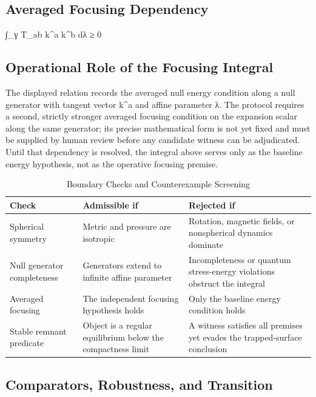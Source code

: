 \documentclass[conference]{IEEEtran}
\begin{document}
\subsection{Averaged Focusing Dependency}
∫\_γ T\_ab k\textasciicircum{}a k\textasciicircum{}b dλ ≥ 0~\cite{cite_0ed84243cf171bc4}

\subsection{Operational Role of the Focusing Integral}
The displayed relation records the averaged null energy condition along a null generator with tangent vector k\textasciicircum{}a and affine parameter λ. The protocol requires a second, strictly stronger averaged focusing condition on the expansion scalar along the same generator; its precise mathematical form is not yet fixed and must be supplied by human review before any candidate witness can be adjudicated. Until that dependency is resolved, the integral above serves only as the baseline energy hypothesis, not as the operative focusing premise.

\begin{table}[htbp]
\centering
\footnotesize
\setlength{\tabcolsep}{3pt}
\renewcommand{\arraystretch}{1.12}
\caption{Boundary Checks and Counterexample Screening}
\label{tab:study-design-and-methods-sd-4}
\begin{tabular}{|p{}|p{}|p{}|}
\hline
Check & Admissible if & Rejected if \\\hline
Spherical symmetry & Metric and pressure are isotropic & Rotation, magnetic fields, or nonspherical dynamics dominate \\\hline
Null generator completeness & Generators extend to infinite affine parameter & Incompleteness or quantum stress-energy violations obstruct the integral \\\hline
Averaged focusing & The independent focusing hypothesis holds & Only the baseline energy condition holds \\\hline
Stable remnant predicate & Object is a regular equilibrium below the compactness limit & A witness satisfies all premises yet evades the trapped-surface conclusion \\\hline
\end{tabular}
\end{table}

\subsection{Comparators, Robustness, and Transition}
\end{document}
